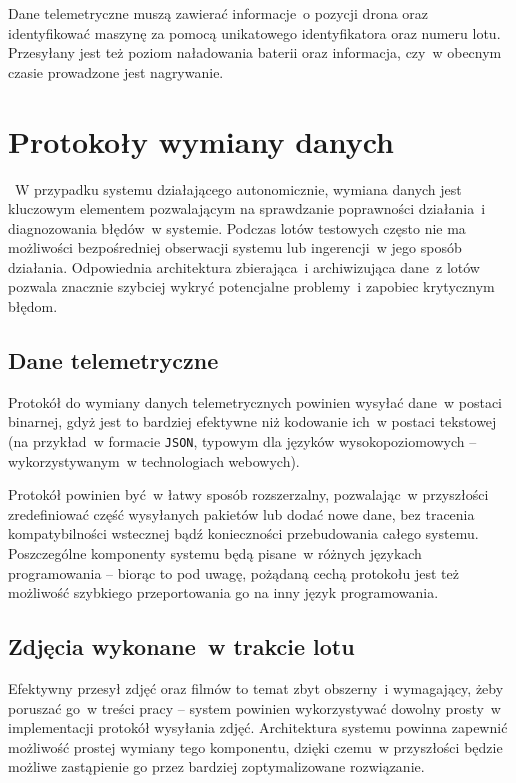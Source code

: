 Dane telemetryczne muszą zawierać informacje~o pozycji
drona oraz identyfikować maszynę za pomocą unikatowego
identyfikatora oraz numeru lotu. Przesyłany jest też
poziom naładowania baterii oraz informacja, czy~w obecnym
czasie prowadzone jest nagrywanie.

\section{Protokoły wymiany danych}
~W przypadku systemu działającego autonomicznie, wymiana danych jest kluczowym
elementem pozwalającym na sprawdzanie poprawności działania~i diagnozowania błędów~w systemie. Podczas lotów testowych
często nie ma możliwości bezpośredniej obserwacji systemu
lub ingerencji~w jego sposób działania. Odpowiednia architektura
zbierająca~i archiwizująca dane~z lotów pozwala znacznie szybciej 
wykryć potencjalne problemy~i zapobiec krytycznym błędom. 

\subsection{Dane telemetryczne}
Protokół do wymiany danych telemetrycznych powinien
wysyłać dane~w postaci binarnej, gdyż jest to bardziej
efektywne niż kodowanie ich~w postaci tekstowej (na
przykład~w formacie \texttt{JSON}, typowym dla języków
wysokopoziomowych -- wykorzystywanym~w technologiach webowych).

Protokół powinien być~w łatwy sposób rozszerzalny,
pozwalając~w przyszłości zredefiniować część wysyłanych
pakietów lub dodać nowe dane, bez tracenia kompatybilności
wstecznej bądź konieczności przebudowania całego systemu.
Poszczególne komponenty systemu będą pisane~w różnych
językach programowania -- biorąc to pod uwagę, pożądaną
cechą protokołu jest też możliwość szybkiego przeportowania
go na inny język programowania. 

\subsection{Zdjęcia wykonane~w trakcie lotu} \label{functional_requirements_imagezmq}
Efektywny przesył zdjęć oraz filmów to temat zbyt obszerny~i
wymagający, żeby poruszać go~w treści pracy -- system
powinien wykorzystywać dowolny prosty~w implementacji
protokół wysyłania zdjęć. Architektura systemu powinna
zapewnić możliwość prostej wymiany tego komponentu, dzięki
czemu~w przyszłości będzie możliwe zastąpienie go
przez bardziej zoptymalizowane rozwiązanie.

